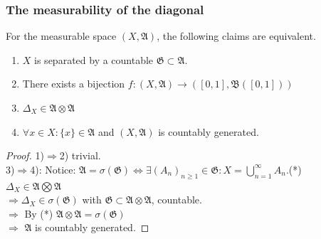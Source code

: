 \subsubsection{The measurability of the diagonal}
\begin{theorem}
	For the measurable space $(X, \mathfrak{A})$, the following claims are equivalent.
	\begin{enumerate}
		\item $X$ is separated by a countable $\mathfrak{G} \subset \mathfrak{A}$.
		\item There exists a bijection $f: (X, \mathfrak{A}) \rightarrow ([0, 1], \mathfrak{B}([0, 1]))$
		\item $\Delta_X \in \mathfrak{A} \otimes \mathfrak{A}$ 
		\item $\forall x \in X: \{x\} \in \mathfrak{A}$ and $(X, \mathfrak{A})$ is countably generated.
	\end{enumerate}
\end{theorem}
\begin{proof}
1)$\Rightarrow$2) trivial. \\
	3)$\Rightarrow$4): Notice: $\mathfrak{A} = \sigma(\mathfrak{G}) \Leftrightarrow \exists (A_n)_{n \geq 1} \in \mathfrak{G}: X = \bigcup_{n = 1}^\infty A_n$.(*)\\ 
	$\Delta_X \in \mathfrak{A} \bigotimes \mathfrak{A}$\\
	 $\Rightarrow \Delta_X \in \sigma(\mathfrak{G})$ with $\mathfrak{G} \subset \mathfrak{A} \otimes \mathfrak{A}$, countable.\\
	$\Rightarrow$ By (*) $\mathfrak{A} \otimes \mathfrak{A} = \sigma (\mathfrak{G})$\\
	$\Rightarrow$ $\mathfrak{A}$ is countably generated.
\end{proof}


